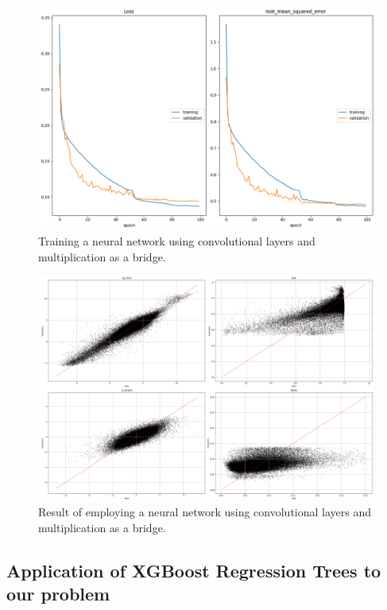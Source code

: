 \begin{figure}[H]
    \centering
    \includegraphics[width=1\textwidth]{figures/neural_net_regression_multiplication/train_logcosh_multiplication_silu.png}
    \caption{Training a neural network using convolutional layers and multiplication as a bridge.}
    \label{fig:train_multiply_reg_balanced}
\end{figure}

\begin{figure}[H]
    \centering
    \includegraphics[width=1\textwidth]{figures/neural_net_regression_multiplication/output_neural_net_multiplication_silu.png}
    \caption{Result of employing a neural network using convolutional layers and multiplication as a bridge.}
    \label{fig:result_multiply_reg_balanced}
\end{figure}


\subsection{Application of XGBoost Regression Trees to our problem}

